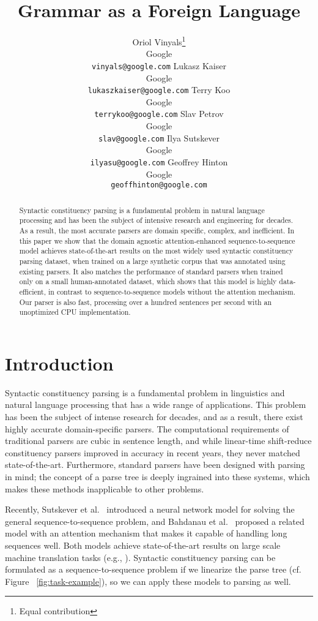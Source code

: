 \documentclass{article} \usepackage{nips15submit_e,times}
\title{Grammar as a Foreign Language}
\author{
Oriol Vinyals\thanks{Equal contribution}\\
Google\\
\texttt{vinyals@google.com}
\And
Lukasz Kaiser\samethanks \\
Google\\
\texttt{lukaszkaiser@google.com}
\AND
Terry Koo \\
Google\\
\texttt{terrykoo@google.com}
\And
Slav Petrov \\
Google\\
\texttt{slav@google.com}
\And
Ilya Sutskever \\
Google\\
\texttt{ilyasu@google.com}
\And
Geoffrey Hinton \\
Google\\
\texttt{geoffhinton@google.com}
}
\begin{document}
\maketitle
\vspace{-4mm}

\begin{abstract}
Syntactic constituency parsing is a fundamental problem in natural
language processing and has been the subject of intensive research
and engineering for decades.  As a result, the most accurate parsers
are domain specific, complex, and inefficient.  In this paper we show
that the domain agnostic attention-enhanced sequence-to-sequence model
achieves state-of-the-art results on the most widely used syntactic
constituency parsing dataset, when trained on a large synthetic
corpus that was annotated using existing parsers.  It also matches the
performance of standard parsers when trained only on a small
human-annotated dataset, which shows that this model is highly
data-efficient, in contrast to sequence-to-sequence models without the
attention mechanism.  Our parser is also fast, processing over a
hundred sentences per second with an unoptimized CPU implementation.
\end{abstract}
\vspace{-0mm}
\section{Introduction}
\label{sec:intro}

Syntactic constituency parsing is a fundamental problem in linguistics
and natural language processing that has a wide range of applications.
This problem has been the subject of intense research for decades, and
as a result, there exist highly accurate domain-specific parsers.
The computational requirements of traditional parsers are cubic in
sentence length, and while linear-time shift-reduce constituency parsers
improved in accuracy in recent years, they never matched state-of-the-art.
Furthermore, standard parsers have been designed with parsing in mind;
the concept of a parse tree is deeply ingrained into these systems,
which makes these methods inapplicable to other problems.

Recently, Sutskever et al.~\cite{sutskever14} introduced a neural
network model for solving the general sequence-to-sequence problem,
and Bahdanau et al.~\cite{bahdanau2014neural} proposed a related model
with an attention mechanism that makes it capable of handling long
sequences well.  Both models achieve state-of-the-art results on large
scale machine translation tasks (e.g., \cite{thang14,jean2014using}).
Syntactic constituency parsing can be formulated as a
sequence-to-sequence problem if we linearize the parse tree
(cf. Figure ~\ref{fig:task-example}), so we can apply these models to
parsing as well.
\end{document}
